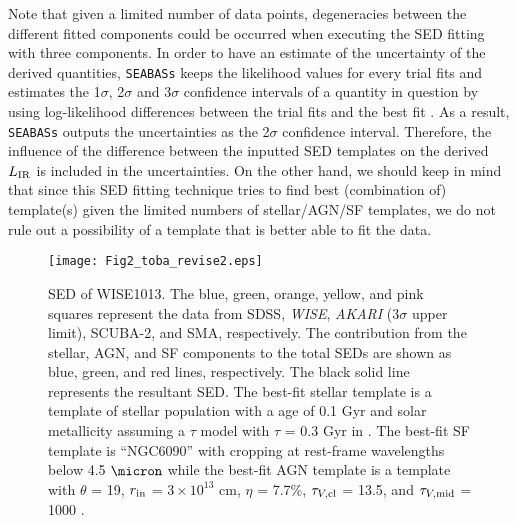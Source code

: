 \documentclass[twocolumn]{aastex6}
\begin{document}
Note that given a limited number of data points, degeneracies between the different fitted components could be occurred when executing the SED fitting with three components.
In order to have an estimate of the uncertainty of the derived quantities, {\tt SEABASs} keeps the likelihood values for every trial fits and estimates the 1$\sigma$, 2$\sigma$ and 3$\sigma$ confidence intervals of a quantity in question by using log-likelihood differences between the trial fits and the best fit \citep[see Appendix A in][for more detail]{Rovilos}.
As a result, {\tt SEABASs} outputs the uncertainties as the 2$\sigma$ confidence interval.
Therefore, the influence of the difference between the inputted SED templates on the derived $L_{\rm IR}$ is included in the uncertainties.
On the other hand, we should keep in mind that since this SED fitting technique tries to find best (combination of) template(s) given the limited numbers of stellar/AGN/SF templates, we do not rule out a possibility of a template that is better able to fit the data.

   \begin{figure*}
   \centering
   \texttt{[image: Fig2\_toba\_revise2.eps]}
   \caption{SED of WISE1013. The blue, green, orange, yellow, and pink squares represent the data from SDSS, {\it WISE}, {\it AKARI} (3$\sigma$ upper limit), SCUBA-2, and SMA, respectively. The contribution from the stellar, AGN, and SF components to the total SEDs are shown as blue, green, and red lines, respectively. The black solid line represents the resultant SED. The best-fit stellar template is a template of stellar population with a age of 0.1 Gyr and solar metallicity assuming a $\tau$ model with $\tau$ = 0.3 Gyr in \cite{Bruzual}. The best-fit SF template is ``NGC6090'' \citep{Polletta} with cropping at rest-frame wavelengths below 4.5 $\micron$ while the best-fit AGN template is a template with  $\theta$ = 19\arcdeg, $r_{\rm in}$ = $3\times10^{13}$ cm, $\eta$ = 7.7\%, $\tau_{V,{\rm cl}}$ = 13.5, and $\tau_{V,{\rm mid}}$ = 1000 \citep{Siebenmorgen}.}
   \label{SED}
   \end{figure*}   
   
\end{document}
